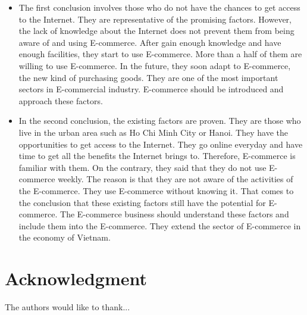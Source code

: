 \documentclass[conference]{IEEEtran}
\begin{document}
\begin{itemize}
\item The first conclusion involves those who do not have the chances to get access to the Internet. They are representative of the promising factors. However, the lack of knowledge about the Internet does not prevent them from being aware of and using E-commerce. After gain enough knowledge and have enough facilities, they start to use E-commerce. More than a half of them are willing to use E-commerce. In the future, they soon adapt to E-commerce, the new kind of purchasing goods. They are one of the most important sectors in E-commercial industry. E-commerce should be introduced and approach these factors.
\item In the second conclusion, the existing factors are proven. They are those who live in the urban area such as Ho Chi Minh City or Hanoi. They have the opportunities to get access to the Internet. They go online everyday and have time to get all the benefits the Internet brings to. Therefore, E-commerce is familiar with them. On the contrary, they said that they do not use E-commerce weekly. The reason is that they are not aware of the activities of the E-commerce. They use E-commerce without knowing it. That comes to the conclusion that these existing factors still have the potential for E-commerce. The E-commerce business should understand these factors and include them into the E-commerce. They extend the sector of E-commerce in the economy of Vietnam.

\end{itemize}






\section*{Acknowledgment}


The authors would like to thank...






\end{document}
